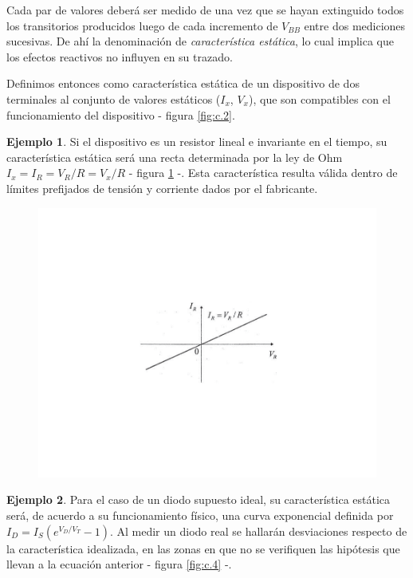 \documentclass{book} %
\theoremstyle{definition}
\newtheorem{exmp}{Ejemplo}[]
\theoremstyle{definition}
\begin{document}
\begin{appendices}
Cada par de valores deberá ser medido de una vez que se hayan extinguido todos los transitorios producidos luego de cada incremento de $V_{BB}$ entre dos mediciones sucesivas. De ahí la denominación de \emph{característica estática}, lo cual implica que los efectos reactivos no influyen en su trazado.

Definimos entonces como característica estática de un dispositivo de dos terminales al conjunto de valores estáticos ($I_x$, $V_x$), que son compatibles con el funcionamiento del dispositivo - figura \ref{fig:c.2}.

\begin{exmp}
Si el dispositivo es un resistor lineal e invariante en el tiempo, su característica estática será una recta determinada por la ley de Ohm $I_x=I_R=V_R/R=V_x/R$ - figura \ref{fig:c.3} -. Esta característica resulta válida dentro de límites prefijados de tensión y corriente dados por el fabricante.

\begin{figure}[!htbp]
    \centering
    \includegraphics[scale=1]{figurac03.pdf}
    \caption{}
    \label{fig:c.3}
\end{figure}

\end{exmp}

\begin{exmp}
Para el caso de un diodo supuesto ideal, su característica estática será, de acuerdo a su funcionamiento físico, una curva exponencial definida por $I_D=I_S\left(e^{V_D/V_T}-1\right)$. Al medir un diodo real se hallarán desviaciones respecto de la característica idealizada, en las zonas en que no se verifiquen las hipótesis que llevan a la ecuación anterior - figura \ref{fig:c.4} -.


\end{exmp}
\end{appendices}
\end{document}
